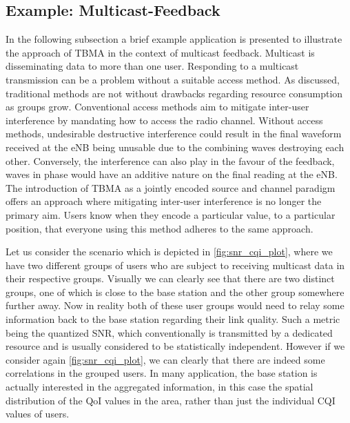 \documentclass{article}
\begin{document}
\subsection{Example: Multicast-Feedback}\label{example_multicast_feedback}

In the following subsection a brief example application is presented to illustrate the approach of \ac{TBMA} in the context of multicast feedback. Multicast is disseminating data to more than one user. Responding to a multicast transmission can be a problem without a suitable access method. As discussed, traditional methods are not without drawbacks regarding resource consumption as groups grow. Conventional access methods aim to mitigate inter-user interference by mandating how to access the radio channel. Without access methods, undesirable destructive interference could result in the final waveform received at the eNB being unusable due to the combining waves destroying each other. Conversely, the interference can also play in the favour of the feedback, waves in phase would have an additive nature on the final reading at the eNB. The introduction of \ac{TBMA} as a jointly encoded source and channel paradigm offers an approach where mitigating inter-user interference is no longer the primary aim. Users know when they encode a particular value, to a particular position, that everyone using this method adheres to the same approach. 

Let us consider the scenario which is depicted in \cref{fig:snr_cqi_plot}, where we have two different groups of users who are subject to receiving multicast data in their respective groups. Visually we can clearly see that there are two distinct groups, one of which is close to the base station and the other group somewhere further away. Now in reality both of these user groups would need to relay some information back to the base station regarding their link quality. Such a metric being the quantized \ac{SNR}, which conventionally is transmitted by a dedicated resource and is usually considered to be statistically independent. However if we consider again \cref{fig:snr_cqi_plot}, we can clearly that there are indeed some correlations in the grouped users. In many application, the base station is actually interested in the aggregated information, in this case the spatial distribution of the \ac{QoI} values in the area, rather than just the individual CQI values of users. 
\end{document}

